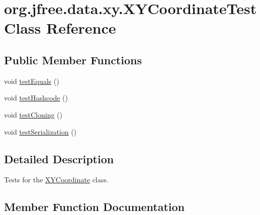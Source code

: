 \hypertarget{classorg_1_1jfree_1_1data_1_1xy_1_1_x_y_coordinate_test}{}\section{org.\+jfree.\+data.\+xy.\+X\+Y\+Coordinate\+Test Class Reference}
\label{classorg_1_1jfree_1_1data_1_1xy_1_1_x_y_coordinate_test}
\subsection*{Public Member Functions}
\begin{DoxyCompactItemize}
\item 
void \mbox{\hyperlink{classorg_1_1jfree_1_1data_1_1xy_1_1_x_y_coordinate_test_a076bd34f1c7330aa229040ed61d671c0}{test\+Equals}} ()
\item 
void \mbox{\hyperlink{classorg_1_1jfree_1_1data_1_1xy_1_1_x_y_coordinate_test_acb4f57c9ebab445cea0875cbe01bf85d}{test\+Hashcode}} ()
\item 
void \mbox{\hyperlink{classorg_1_1jfree_1_1data_1_1xy_1_1_x_y_coordinate_test_a7ae15692160a32d4b371d6217fa421ec}{test\+Cloning}} ()
\item 
void \mbox{\hyperlink{classorg_1_1jfree_1_1data_1_1xy_1_1_x_y_coordinate_test_a23c4a39953235558a54003551837929d}{test\+Serialization}} ()
\end{DoxyCompactItemize}


\subsection{Detailed Description}
Tests for the \mbox{\hyperlink{classorg_1_1jfree_1_1data_1_1xy_1_1_x_y_coordinate}{X\+Y\+Coordinate}} class. 

\subsection{Member Function Documentation}
\mbox{\label{classorg_1_1jfree_1_1data_1_1xy_1_1_x_y_coordinate_test_a7ae15692160a32d4b371d6217fa421ec}} 
